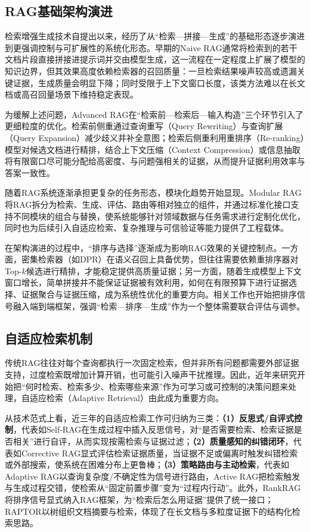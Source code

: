 \subsection{RAG基础架构演进}
检索增强生成技术自提出以来，经历了从“检索—拼接—生成”的基础形态逐步演进到更强调控制与可扩展性的系统化形态。早期的Naive RAG通常将检索到的若干文档片段直接拼接进提示词并交由模型生成，这一流程在一定程度上扩展了模型的知识边界，但其效果高度依赖检索器的召回质量：一旦检索结果噪声较高或遗漏关键证据，生成质量会明显下降；同时受限于上下文窗口长度，该类方法难以在长文档或高召回量场景下维持稳定表现。

为缓解上述问题，Advanced RAG在“检索前—检索后—输入构造”三个环节引入了更细粒度的优化。检索前侧重通过查询重写（Query Rewriting）与查询扩展（Query Expansion）减少歧义并补全意图；检索后侧重利用重排序（Re-ranking）模型对候选文档进行精排，结合上下文压缩（Context Compression）或信息抽取将有限窗口尽可能分配给高密度、与问题强相关的证据，从而提升证据利用效率与答案一致性\cite{manning_ir, rocchio, bert_rerank, llmlingua}。

随着RAG系统逐渐承担更复杂的任务形态，模块化趋势开始显现。Modular RAG\cite{ref27}将RAG拆分为检索、生成、评估、路由等相对独立的组件，并通过标准化接口支持不同模块的组合与替换，使系统能够针对领域数据与任务需求进行定制化优化，同时也为后续引入自适应检索、复杂推理与可信验证等能力提供了工程载体。

在架构演进的过程中，“排序与选择”逐渐成为影响RAG效果的关键控制点。一方面，密集检索器（如DPR）\cite{ref6}在语义召回上具备优势，但往往需要依赖重排序器对Top-$k$候选进行精排，才能稳定提供高质量证据；另一方面，随着生成模型上下文窗口增长，简单拼接并不能保证证据被有效利用，如何在有限预算下进行证据选择、证据聚合与证据压缩，成为系统性优化的重要方向。相关工作也开始把排序信号融入端到端框架，强调“检索—排序—生成”作为一个整体需要联合评估与调参\cite{ref10}。

\subsection{自适应检索机制}
传统RAG往往对每个查询都执行一次固定检索，但并非所有问题都需要外部证据支持，过度检索既增加计算开销，也可能引入噪声干扰推理。因此，近年来研究开始把“何时检索、检索多少、检索哪些来源”作为可学习或可控制的决策问题来处理，自适应检索（Adaptive Retrieval）由此成为重要方向。

从技术范式上看，近三年的自适应检索工作可归纳为三类：\textbf{（1）反思式/自评式控制}，代表如Self-RAG\cite{ref8}在生成过程中插入反思信号，对“是否需要检索、检索证据是否相关”进行自评，从而实现按需检索与证据过滤；\textbf{（2）质量感知的纠错闭环}，代表如Corrective RAG\cite{ref9}显式评估检索证据质量，当证据不足或偏离时触发纠错检索或外部搜索，使系统在困难分布上更鲁棒；\textbf{（3）策略路由与主动检索}，代表如Adaptive RAG\cite{ref11}以查询复杂度/不确定性为信号进行路由，Active RAG\cite{ref12}把检索触发与生成过程交错，使检索从“固定前置步骤”变为“过程内行动”。此外，RankRAG\cite{ref10}将排序信号显式纳入RAG框架，为“检索后怎么用证据”提供了统一接口；RAPTOR\cite{ref13}以树组织文档摘要与检索，体现了在长文档与多粒度证据下的结构化检索思路。


